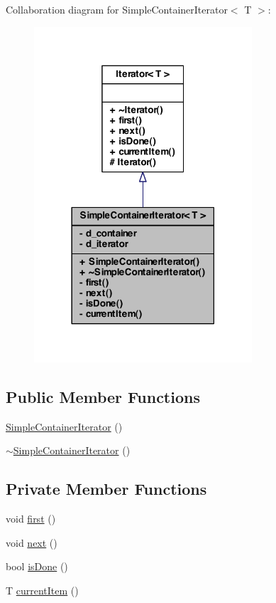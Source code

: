 Collaboration diagram for SimpleContainerIterator$<$ T $>$:
\nopagebreak
\begin{figure}[H]
\begin{center}
\leavevmode
\includegraphics[width=230pt]{class_simple_container_iterator__coll__graph}
\end{center}
\end{figure}
\subsection*{Public Member Functions}
\begin{DoxyCompactItemize}
\item 
\hyperlink{class_simple_container_iterator_a7efe60ad1b976260e29cfc793b9f5b1a}{SimpleContainerIterator} ()
\item 
\hyperlink{class_simple_container_iterator_a4f1d34a0c187f4359885755372b6aa79}{$\sim$SimpleContainerIterator} ()
\end{DoxyCompactItemize}
\subsection*{Private Member Functions}
\begin{DoxyCompactItemize}
\item 
void \hyperlink{class_simple_container_iterator_a71b26d5acddcab75ca0386c187fd2bbc}{first} ()
\item 
void \hyperlink{class_simple_container_iterator_a11274af2bc4dc9930f983b7b246d8f87}{next} ()
\item 
bool \hyperlink{class_simple_container_iterator_a91352e803f39fb58d9312d9d866842c8}{isDone} ()
\item 
T \hyperlink{class_simple_container_iterator_ad65642e6d9540b58193e7a40f1688fc7}{currentItem} ()
\end{DoxyCompactItemize}
